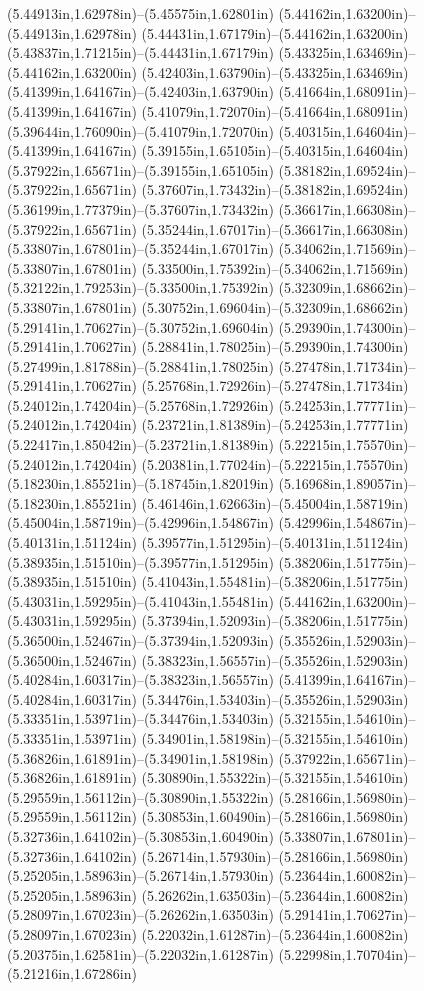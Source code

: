 (5.44913in,1.62978in)--(5.45575in,1.62801in) (5.44162in,1.63200in)--(5.44913in,1.62978in) (5.44431in,1.67179in)--(5.44162in,1.63200in) (5.43837in,1.71215in)--(5.44431in,1.67179in) (5.43325in,1.63469in)--(5.44162in,1.63200in) (5.42403in,1.63790in)--(5.43325in,1.63469in) (5.41399in,1.64167in)--(5.42403in,1.63790in) (5.41664in,1.68091in)--(5.41399in,1.64167in) (5.41079in,1.72070in)--(5.41664in,1.68091in) (5.39644in,1.76090in)--(5.41079in,1.72070in) (5.40315in,1.64604in)--(5.41399in,1.64167in) (5.39155in,1.65105in)--(5.40315in,1.64604in) (5.37922in,1.65671in)--(5.39155in,1.65105in) (5.38182in,1.69524in)--(5.37922in,1.65671in) (5.37607in,1.73432in)--(5.38182in,1.69524in) (5.36199in,1.77379in)--(5.37607in,1.73432in) (5.36617in,1.66308in)--(5.37922in,1.65671in) (5.35244in,1.67017in)--(5.36617in,1.66308in) (5.33807in,1.67801in)--(5.35244in,1.67017in) (5.34062in,1.71569in)--(5.33807in,1.67801in) (5.33500in,1.75392in)--(5.34062in,1.71569in) (5.32122in,1.79253in)--(5.33500in,1.75392in) (5.32309in,1.68662in)--(5.33807in,1.67801in) (5.30752in,1.69604in)--(5.32309in,1.68662in) (5.29141in,1.70627in)--(5.30752in,1.69604in) (5.29390in,1.74300in)--(5.29141in,1.70627in) (5.28841in,1.78025in)--(5.29390in,1.74300in) (5.27499in,1.81788in)--(5.28841in,1.78025in) (5.27478in,1.71734in)--(5.29141in,1.70627in) (5.25768in,1.72926in)--(5.27478in,1.71734in) (5.24012in,1.74204in)--(5.25768in,1.72926in) (5.24253in,1.77771in)--(5.24012in,1.74204in) (5.23721in,1.81389in)--(5.24253in,1.77771in) (5.22417in,1.85042in)--(5.23721in,1.81389in) (5.22215in,1.75570in)--(5.24012in,1.74204in) (5.20381in,1.77024in)--(5.22215in,1.75570in) (5.18230in,1.85521in)--(5.18745in,1.82019in) (5.16968in,1.89057in)--(5.18230in,1.85521in) (5.46146in,1.62663in)--(5.45004in,1.58719in) (5.45004in,1.58719in)--(5.42996in,1.54867in) (5.42996in,1.54867in)--(5.40131in,1.51124in) (5.39577in,1.51295in)--(5.40131in,1.51124in) (5.38935in,1.51510in)--(5.39577in,1.51295in) (5.38206in,1.51775in)--(5.38935in,1.51510in) (5.41043in,1.55481in)--(5.38206in,1.51775in) (5.43031in,1.59295in)--(5.41043in,1.55481in) (5.44162in,1.63200in)--(5.43031in,1.59295in) (5.37394in,1.52093in)--(5.38206in,1.51775in) (5.36500in,1.52467in)--(5.37394in,1.52093in) (5.35526in,1.52903in)--(5.36500in,1.52467in) (5.38323in,1.56557in)--(5.35526in,1.52903in) (5.40284in,1.60317in)--(5.38323in,1.56557in) (5.41399in,1.64167in)--(5.40284in,1.60317in) (5.34476in,1.53403in)--(5.35526in,1.52903in) (5.33351in,1.53971in)--(5.34476in,1.53403in) (5.32155in,1.54610in)--(5.33351in,1.53971in) (5.34901in,1.58198in)--(5.32155in,1.54610in) (5.36826in,1.61891in)--(5.34901in,1.58198in) (5.37922in,1.65671in)--(5.36826in,1.61891in) (5.30890in,1.55322in)--(5.32155in,1.54610in) (5.29559in,1.56112in)--(5.30890in,1.55322in) (5.28166in,1.56980in)--(5.29559in,1.56112in) (5.30853in,1.60490in)--(5.28166in,1.56980in) (5.32736in,1.64102in)--(5.30853in,1.60490in) (5.33807in,1.67801in)--(5.32736in,1.64102in) (5.26714in,1.57930in)--(5.28166in,1.56980in) (5.25205in,1.58963in)--(5.26714in,1.57930in) (5.23644in,1.60082in)--(5.25205in,1.58963in) (5.26262in,1.63503in)--(5.23644in,1.60082in) (5.28097in,1.67023in)--(5.26262in,1.63503in) (5.29141in,1.70627in)--(5.28097in,1.67023in) (5.22032in,1.61287in)--(5.23644in,1.60082in) (5.20375in,1.62581in)--(5.22032in,1.61287in) (5.22998in,1.70704in)--(5.21216in,1.67286in) 